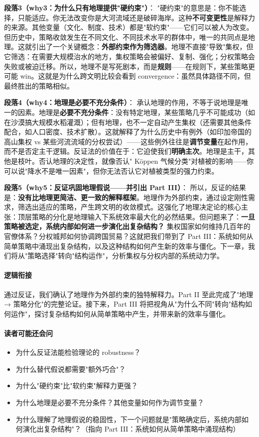 \documentclass[../main.tex]{subfiles}
\begin{document}
	\textbf{段落3（why3：为什么只有地理提供"硬约束"）}：  
	"硬约束"的意思是：你不能选择，只能适应。你无法改变你是大河流域还是破碎海岸。这种\textbf{不可变更性}是解释力的来源。其他变量（文化、制度、技术）都是"软约束"——它们可以被人为改变。但历史中，策略收敛发生在不同文化、不同技术水平的群体中，唯一的共同点是地理。这就引出了一个关键概念：\textbf{外部约束作为筛选器}。地理不直接"导致"集权，但它筛选：在需要大规模治水的地方，集权策略会被偏好、复制、强化；分权策略会失败或被迫迁移。所以，地理不是写死剧本，而是\textbf{规则}——在规则下，某些策略更可能 win。这就是为什么跨文明比较会看到 convergence：虽然具体路径不同，但最终胜出的策略相似。
	
	\textbf{段落4（why4：地理是必要不充分条件）}：  
	承认地理的作用，不等于说地理是唯一的因素。地理是\textbf{必要不充分条件}：没有特定地理，某些策略几乎不可能成功（如在沙漠搞大规模水稻灌溉）；但有地理，也不一定自动产生集权（还需要其他条件配合，如人口密度、技术扩散）。这就解释了为什么历史中有例外（如印加帝国的高山集权 vs 某些河流流域的分权尝试）——这些例外往往是\textbf{调节变量}在起作用，而不是否定主干逻辑。反证法的价值在于：它迫使我们\textbf{明确主次}。地理是主干，其他是枝叶。否认地理的决定性，就像否认" Köppen 气候分类"对植被的影响——你可以说"降水不是唯一因素"，但你无法否认它对植被类型的强力约束。
	
	\textbf{段落5（why5：反证巩固地理假说——并引出 Part III）}：  
	所以，反证的结果是：\textbf{没有比地理更简洁、更一致的解释框架}。地理作为外部约束，通过设定刚性需求，筛选出适应的策略，产生跨文明的收敛模式。这强化了地理决定论的核心主张：顶层策略的分化是地理输入下系统效率最大化的必然结果。但问题来了：\textbf{一旦策略被选定，系统内部如何进一步演化出复杂结构？} 集权国家如何维持几百年的官僚体系？分权城邦如何协调跨国贸易？这就把我们带到了 Part III：系统如何从简单策略中涌现出复杂结构，以及这种结构如何产生新的效率与僵化。下一章，我们将从"策略选择"转向"结构运作"，分析集权与分权内部的系统动力学。
	
	\paragraph*{逻辑衔接}
	通过反证，我们确认了地理作为外部约束的独特解释力。Part II 至此完成了"地理 → 策略分化"的完整论证。接下来，Part III 将把视角从"为什么不同"转向"结构如何运作"，探讨复杂结构如何从简单策略中产生，并带来新的效率与僵化。
	
	\paragraph*{读者可能还会问}
	\begin{itemize}
\item 为什么反证法能检验理论的 robustness？
	\item 为什么替代假说都需要"额外巧合"？
	\item 为什么"硬约束"比"软约束"解释力更强？
	\item 为什么地理是必要不充分条件？其他变量如何作为调节变量？
	\item 为什么理解了地理假说的稳固性，下一个问题就是"策略确定后，系统内部如何演化出复杂结构"？（指向 Part III：系统如何从简单策略中涌现结构）
\end{itemize}
	
\end{document}
